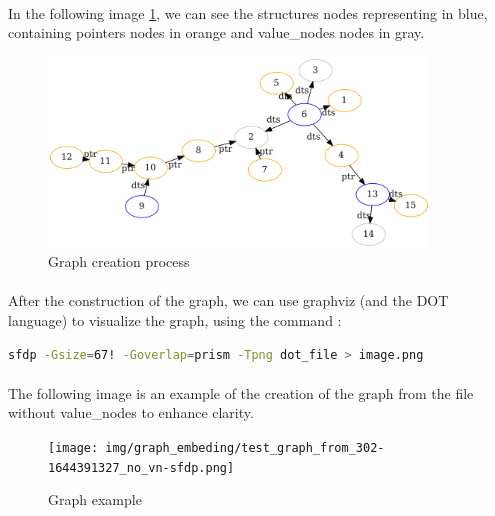         \paragraph{}In the following image \ref{fig:graph_embedding:graph_creation_process}, we can see the \glspl{structure} nodes representing in blue, containing \glspl{pointer} nodes in orange and \glspl{value_node} nodes in gray. 

        \begin{figure}[H]
            \centering
            \includegraphics[width=0.9\textwidth]{img/graph_embeding/graph_explain.png}
            \caption{Graph creation process}
            \label{fig:graph_embedding:graph_creation_process}
        \end{figure}

        \paragraph{}After the construction of the graph, we can use graphviz (and the DOT language)\cite{farin_graphviz_2004} to visualize the graph, using the command :
        \begin{lstlisting}[language=bash]
            sfdp -Gsize=67! -Goverlap=prism -Tpng dot_file > image.png
        \end{lstlisting}

        \paragraph{}The following image is an example of the creation of the graph from the file  without \glspl{value_node} to enhance clarity.
        \begin{figure}[H]
            \centering
            \texttt{[image: img/graph\_embeding/test\_graph\_from\_302-1644391327\_no\_vn-sfdp.png]}
            \caption{Graph example}
            \label{fig:graph_embedding:graph_example}
        \end{figure}

